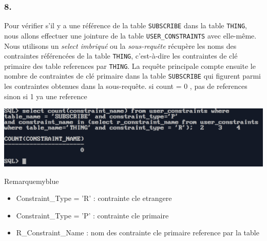 \subsubsection*{8.}
Pour vérifier s'il y a une référence de la table \texttt{SUBSCRIBE} dans la table \texttt{THING},
nous allons effectuer une jointure de la table \texttt{USER\_CONSTRAINTS} avec elle-même. Nous 
utilisons un \textit{select imbriqué} ou la \textit{sous-requête} récupère les noms
des contraintes référencées de la table \texttt{THING}, c'est-à-dire les contraintes de clé
primaire des table references par \texttt{THING}. La requête principale compte ensuite le nombre de contraintes de 
clé primaire dans la table \texttt{SUBSCRIBE} qui figurent parmi les contraintes obtenues dans la sous-requête. 
si count = 0 , pas de references sinon si 1 ya une reference 



\begin{center}
    \includegraphics[width=\textwidth]{ScreenShot/Partie5/fr.png}
\end{center}

\begin{prettyBox}{Remarque}{myblue}
\begin{itemize}
    \item Constraint\_Type = 'R' : contrainte cle etrangere
    \item Constraint\_Type = 'P' : contrainte cle primaire
    \item R\_Constraint\_Name : nom des contrainte cle primaire reference par la table
\end{itemize}
\end{prettyBox}



